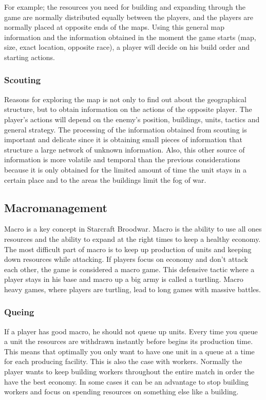 				For example; the resources you need for building and expanding through the game are normally distributed
				equally between the players, and the players are normally placed at opposite ends of the maps. 
				Using this general map information and the information obtained in the moment the game starts 
				(map, size, exact location, opposite race), a player will decide on his build order and starting actions. 
		
			\subsubsection{Scouting}
				Reasons for exploring the map is not only to find out about the geographical structure, 
				but to obtain information on the actions of the opposite player. The player's actions will depend on
				the enemy's position, buildings, units, tactics and general strategy. The processing of the information 
				obtained from scouting is important and delicate since it is obtaining small pieces of information 
				that structure a large network of unknown information. Also, this other source of information 
				is more volatile and temporal than the previous considerations because it is only obtained for the 
				limited amount of time the unit stays in a certain place and to the areas the buildings limit the fog of war.
				
	\subsection{Macromanagement}
		Macro is a key concept in Starcraft Broodwar. 
		Macro is the ability to use all ones resources and the ability to expand at the right times to keep a healthy economy.
		The most difficult part of macro is to keep up production of units and keeping down resources while attacking.
		If players focus on economy and don't attack each other, the game is considered a macro game. This defensive tactic where a
		player stays in his base and macro up a big army is called a turtling. Macro heavy games, where players are turtling, lead to
		long games with massive battles. 
			
			\subsubsection{Queing}
				If a player has good macro, he should not queue up units. 
				Every time you queue a unit the resources are withdrawn instantly before begins its production time. This means that optimally you only want to have one unit in a queue at a time for each producing facility.
				This is also the case with workers. Normally the player wants to keep building workers throughout the entire match in order the have the best economy.
				In some cases it can be an advantage to stop building workers and focus on spending resources on something else like a building.
				
